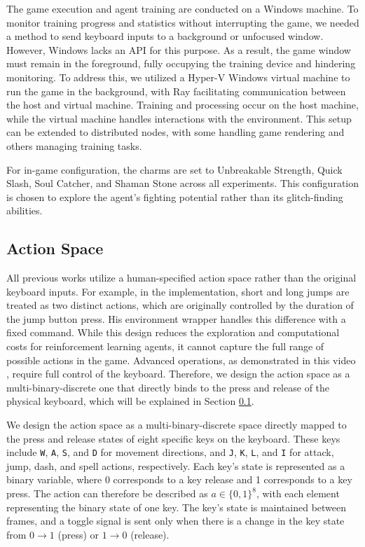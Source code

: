The game execution and agent training are conducted on a Windows machine. 
To monitor training progress and statistics without interrupting the game, we needed a method to send keyboard inputs to a background or unfocused window. 
However, Windows lacks an API for this purpose.
As a result, the game window must remain in the foreground, fully occupying the training device and hindering monitoring.
To address this, we utilized a Hyper-V \citep{scooley_introduction_2022} Windows virtual machine to run the game in the background, with Ray \citep{moritz_ray_2018} facilitating communication between the host and virtual machine. 
Training and processing occur on the host machine, while the virtual machine handles interactions with the environment. 
This setup can be extended to distributed nodes, with some handling game rendering and others managing training tasks.

For in-game configuration, the charms \citep{fandom_categorycharms_2018} are set to Unbreakable Strength, Quick Slash, Soul Catcher, and Shaman Stone across all experiments. 
This configuration is chosen to explore the agent's fighting potential rather than its glitch-finding abilities.

\subsection{Action Space} \label{sec:hk-action-space}
All previous works utilize a human-specified action space rather than the original keyboard inputs.
For example, in the \citet{yang_seermerhollowknight_rl_2023} implementation, short and long jumps are treated as two distinct actions, which are originally controlled by the duration of the jump button press.
His environment wrapper handles this difference with a fixed command.
While this design reduces the exploration and computational costs for reinforcement learning agents, it cannot capture the full range of possible actions in the game.
Advanced operations, as demonstrated in this video \citep{crankytemplar_hollow_2018}, require full control of the keyboard.
Therefore, we design the action space as a multi-binary-discrete one that directly binds to the press and release of the physical keyboard, which will be explained in Section \ref{sec:hk-action-space}.

We design the action space as a multi-binary-discrete space directly mapped to the press and release states of eight specific keys on the keyboard.
These keys include \texttt{W}, \texttt{A}, \texttt{S}, and \texttt{D} for movement directions, and \texttt{J}, \texttt{K}, \texttt{L}, and \texttt{I} for attack, jump, dash, and spell actions, respectively.
Each key's state is represented as a binary variable, where 0 corresponds to a key release and 1 corresponds to a key press.
The action can therefore be described as $a \in \{0, 1\}^8$, with each element representing the binary state of one key.
The key's state is maintained between frames, and a toggle signal is sent only when there is a change in the key state from $0 \rightarrow 1$ (press) or $1 \rightarrow 0$ (release).

